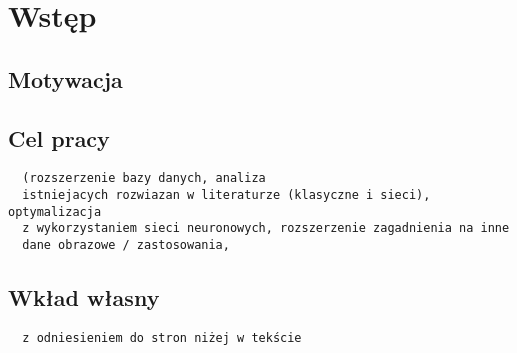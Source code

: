 \chapter{Wstęp}

\section{Motywacja}

\section{Cel pracy}

\begin{verbatim}
  (rozszerzenie bazy danych, analiza 
  istniejacych rozwiazan w literaturze (klasyczne i sieci), optymalizacja 
  z wykorzystaniem sieci neuronowych, rozszerzenie zagadnienia na inne 
  dane obrazowe / zastosowania,
\end{verbatim}

\section{Wkład własny}

\begin{verbatim}
  z odniesieniem do stron niżej w tekście
\end{verbatim}

